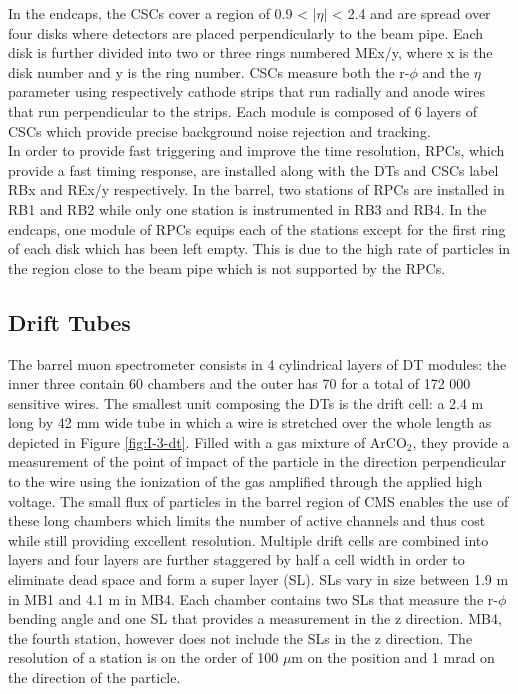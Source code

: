     In the endcaps, the CSCs cover a region of 0.9 < $ | \eta | $ < 2.4 and are spread over four disks where detectors are placed perpendicularly to the beam pipe. Each disk is further divided into two or three rings numbered MEx/y, where x is the disk number and y is the ring number. CSCs measure both the r-$\phi$ and the $ \eta $ parameter using respectively cathode strips that run radially and anode wires that run perpendicular to the strips. Each module is composed of 6 layers of CSCs which provide precise background noise rejection and tracking. \\

    In order to provide fast triggering and improve the time resolution, RPCs, which provide a fast timing response, are installed along with the DTs and CSCs label RBx and REx/y respectively. In the barrel, two stations of RPCs are installed in RB1 and RB2 while only one station is instrumented in RB3 and RB4. In the endcaps, one module of RPCs equips each of the stations except for the first ring of each disk which has been left empty. This is due to the high rate of particles in the region close to the beam pipe which is not supported by the RPCs.

    \subsection{Drift Tubes}

      The barrel muon spectrometer consists in 4 cylindrical layers of DT modules: the inner three contain 60 chambers and the outer has 70 for a total of 172 000 sensitive wires. The smallest unit composing the DTs is the drift cell: a 2.4 m long by 42 mm wide tube in which a wire is stretched over the whole length as depicted in Figure \ref{fig:I-3-dt}. Filled with a gas mixture of ArCO$_2$, they provide a measurement of the point of impact of the particle in the direction perpendicular to the wire using the ionization of the gas amplified through the applied high voltage. The small flux of particles in the barrel region of CMS enables the use of these long chambers which limits the number of active channels and thus cost while still providing excellent resolution. Multiple drift cells are combined into layers and four layers are further staggered by half a cell width in order to eliminate dead space and form a super layer (SL). SLs vary in size between 1.9 m in MB1 and 4.1 m in MB4. Each chamber contains two SLs that measure the r-$\phi$ bending angle and one SL that provides a measurement in the z direction. MB4, the fourth station, however does not include the SLs in the z direction. The resolution of a station is on the order of 100 $\mu$m on the position and 1 mrad on the direction of the particle. \\

